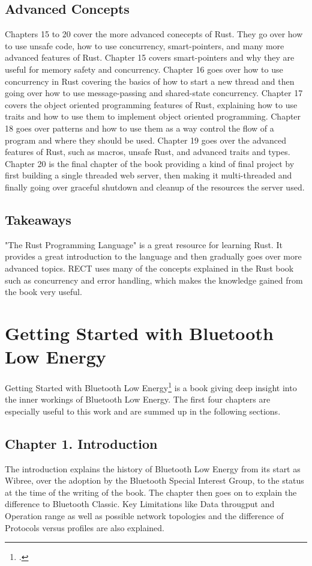 \subsection{Advanced Concepts}
Chapters 15 to 20 cover the more advanced conecepts of Rust. They go over how to use unsafe code, how to use concurrency, smart-pointers, and many more advanced
features of Rust. Chapter 15 covers smart-pointers and why they are useful for memory safety and concurrency. Chapter 16 goes over how to use concurrency in Rust
covering the basics of how to start a new thread and then going over how to use message-passing and shared-state concurrency. Chapter 17 covers the object oriented
programming features of Rust, explaining how to use traits and how to use them to implement object oriented programming. Chapter 18 goes over patterns and how to use
them as a way control the flow of a program and where they should be used. Chapter 19 goes over the advanced features of Rust, such as macros, unsafe Rust, and advanced traits
and types. Chapter 20 is the final chapter of the book providing a kind of final project by first building a single threaded web server, then making it multi-threaded and 
finally going over graceful shutdown and cleanup of the resources the server used.  

\subsection{Takeaways}
"The Rust Programming Language" is a great resource for learning Rust. It provides a great introduction to the language and then gradually goes over more advanced topics.
RECT uses many of the concepts explained in the Rust book such as concurrency and error handling, which makes the knowledge gained from the book very useful.

\section{Getting Started with Bluetooth Low Energy}
Getting Started with Bluetooth Low Energy\footcite{ble_book} is a book giving deep insight into
the inner workings of Bluetooth Low Energy. The first four chapters are especially useful to this
work and are summed up in the following sections.

\subsection{Chapter 1. Introduction}
The introduction explains the history of Bluetooth Low
Energy from its start as Wibree, over the adoption by the Bluetooth Special Interest Group, to
the status at the time of the writing of the book. The chapter then goes on to explain the difference
to Bluetooth Classic. Key Limitations like Data througput and Operation range as well as possible network
topologies and the difference of Protocols versus profiles are also explained.  

